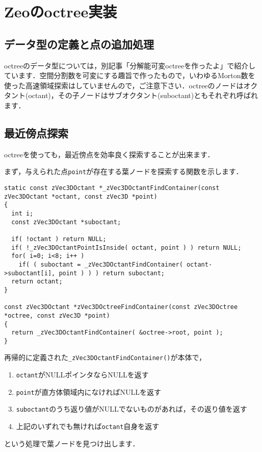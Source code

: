 ﻿\documentclass[a4paper]{jsarticle}
\begin{document}
\section{Zeoのoctree実装}

\subsection{データ型の定義と点の追加処理}

octreeのデータ型については，別記事「分解能可変octreeを作ったよ」で紹介しています．空間分割数を可変にする趣旨で作ったもので，いわゆるMorton数を使った高速領域探索はしていませんので，ご注意下さい．octreeのノードはオクタント(octant)，その子ノードはサブオクタント(suboctant)ともそれぞれ呼ばれます．


\subsection{最近傍点探索}

octreeを使っても，最近傍点を効率良く探索することが出来ます．

まず，与えられた点\verb|point|が存在する葉ノードを探索する関数を示します．
\begin{screen}
\begin{verbatim}
static const zVec3DOctant *_zVec3DOctantFindContainer(const zVec3DOctant *octant, const zVec3D *point)
{
  int i;
  const zVec3DOctant *suboctant;

  if( !octant ) return NULL;
  if( !_zVec3DOctantPointIsInside( octant, point ) ) return NULL;
  for( i=0; i<8; i++ )
    if( ( suboctant = _zVec3DOctantFindContainer( octant->suboctant[i], point ) ) ) return suboctant;
  return octant;
}

const zVec3DOctant *zVec3DOctreeFindContainer(const zVec3DOctree *octree, const zVec3D *point)
{
  return _zVec3DOctantFindContainer( &octree->root, point );
}
\end{verbatim}
\end{screen}
再帰的に定義された\verb|_zVec3DOctantFindContainer()|が本体で，
\begin{enumerate}
\item \verb|octant|がNULLポインタならNULLを返す
\item \verb|point|が直方体領域内になければNULLを返す
\item \verb|suboctant|のうち返り値がNULLでないものがあれば，その返り値を返す
\item 上記のいずれでも無ければ\verb|octant|自身を返す
\end{enumerate}
という処理で葉ノードを見つけ出します．
\end{document}
